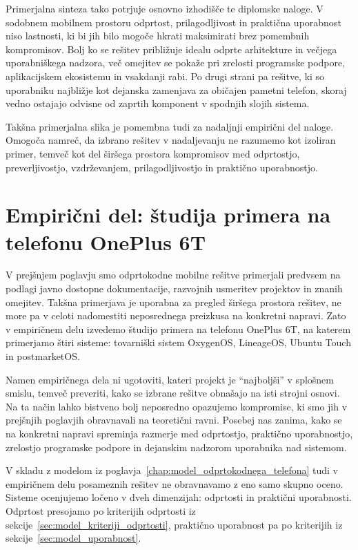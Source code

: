 \documentclass[a4paper,12pt,openright]{book}
\begin{document}
Primerjalna sinteza tako potrjuje osnovno izhodišče te diplomske naloge.
V sodobnem mobilnem prostoru odprtost, prilagodljivost in praktična uporabnost niso lastnosti, ki bi jih bilo mogoče hkrati maksimirati brez pomembnih kompromisov.
Bolj ko se rešitev približuje idealu odprte arhitekture in večjega uporabniškega nadzora, več omejitev se pokaže pri zrelosti programske podpore, aplikacijskem ekosistemu in vsakdanji rabi.
Po drugi strani pa rešitve, ki so uporabniku najbližje kot dejanska zamenjava za običajen pametni telefon, skoraj vedno ostajajo odvisne od zaprtih komponent v spodnjih slojih sistema.

Takšna primerjalna slika je pomembna tudi za nadaljnji empirični del naloge.
Omogoča namreč, da izbrano rešitev v nadaljevanju ne razumemo kot izoliran primer, temveč kot del širšega prostora kompromisov med odprtostjo, preverljivostjo, vzdrževanjem, prilagodljivostjo in praktično uporabnostjo.

\chapter{Empirični del: študija primera na telefonu OnePlus 6T}
\label{chap:empiricni_del}

V prejšnjem poglavju smo odprtokodne mobilne rešitve primerjali predvsem na podlagi javno dostopne dokumentacije, razvojnih usmeritev projektov in znanih omejitev.
Takšna primerjava je uporabna za pregled širšega prostora rešitev, ne more pa v celoti nadomestiti neposrednega preizkusa na konkretni napravi.
Zato v empiričnem delu izvedemo študijo primera na telefonu OnePlus 6T, na katerem primerjamo štiri sisteme: tovarniški sistem OxygenOS, LineageOS, Ubuntu Touch in postmarketOS.

Namen empiričnega dela ni ugotoviti, kateri projekt je \enquote{najboljši} v splošnem smislu, temveč preveriti, kako se izbrane rešitve obnašajo na isti strojni osnovi.
Na ta način lahko bistveno bolj neposredno opazujemo kompromise, ki smo jih v prejšnjih poglavjih obravnavali na teoretični ravni.
Posebej nas zanima, kako se na konkretni napravi spreminja razmerje med odprtostjo, praktično uporabnostjo, zrelostjo programske podpore in dejanskim nadzorom uporabnika nad sistemom.

V skladu z modelom iz poglavja~\ref{chap:model_odprtokodnega_telefona} tudi v empiričnem delu posameznih rešitev ne obravnavamo z eno samo skupno oceno.
Sisteme ocenjujemo ločeno v dveh dimenzijah: odprtosti in praktični uporabnosti.
Odprtost presojamo po kriterijih odprtosti iz sekcije~\ref{sec:model_kriteriji_odprtosti}, praktično uporabnost pa po kriterijih iz sekcije~\ref{sec:model_uporabnost}.
\end{document}
